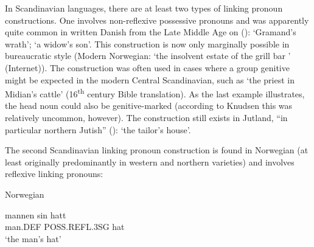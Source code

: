 In Scandinavian languages, there are at least two types of linking pronoun constructions. One involves non-reflexive possessive pronouns and was apparently quite common in written Danish from the Late Middle Age on (\citet[61]{Knudsen1941}): ‘Gramand’s wrath’;  ‘a widow’s son’. This construction is now only marginally possible in bureaucratic style (Modern Norwegian:  ‘the insolvent estate of the grill bar ’ (Internet)). The construction was often used in cases where a group genitive might be expected in the modern Central Scandinavian, such as  ‘the priest in Midian’s cattle’ (16\textsuperscript{th} century Bible translation). As the last example illustrates, the head noun could also be genitive-marked (according to Knudsen this was relatively uncommon, however). The construction still exists in Jutland, “in particular northern Jutish” (\citet[62]{Knudsen1941}):  ‘the tailor’s house’.


The second Scandinavian linking pronoun construction is found in Norwegian (at least originally predominantly in western and northern varieties) and involves reflexive linking pronouns:


\item 

Norwegian



 \ea\label{}
\gll mannen  sin  hatt\\


man.DEF  POSS.REFL.3SG  hat\\

\glt ‘the man’s hat’

\z

